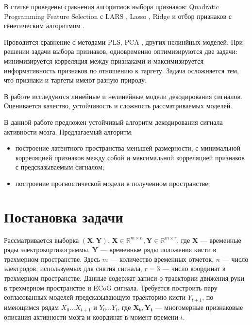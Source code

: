 \documentclass{article}
\begin{document}
В статье \cite{qpfs} проведены сравнения алгоритмов выбора признаков: Quadratic Programming Feature Selection  \cite{qpfs} с LARS \cite{MICHE20112413}, Lasso \cite{zhao2007stagewise}, Ridge \cite{ridge} и отбор признаков с генетическим алгоритмом \cite{tan2008genetic}. \par
Проводится сравнение с методами PLS, PCA\cite{abdi2003pls} \cite{wegelin2000survey}, других нелинйных моделей.  При решении задачи выбора признаков, одновременно оптимизируются две задачи: минимизируется корреляция между признаками и максимизируется информативность признаков по отношению к таргету. Задача осложняется тем, что признаки и таргеты имеют разную природу. \par
В работе исследуются линейные и нелинейные модели декодирования сигналов. Оценивается качество, устойчивость и сложность рассматриваемых моделей. \par
В данной работе предложен устойчивый алгоритм декодирования сигнала активности мозга. Предлагаемый алгоритм:
\begin{itemize}
    \item построение латентного пространства меньшей размерности, с минимальной корреляцией признаков между собой и максимальной корреляцией признаков с предсказываемым сигналом;
    \item построение прогностической модели в полученном пространстве;
\end{itemize}

\section{Постановка задачи}

Рассматривается выборка $(\mathbf{X}, \mathbf{Y}).$ $ \mathbf{X} \in \mathbb{R}^{m \times n},\mathbf{Y} \in \mathbb{R}^{m \times r}$, где $\mathbf{X}$ --- временные ряды электрокортикограммы, $\mathbf{Y}$ --- временные ряды положения кисти в трехмерном пространстве. Здесь $m$ --- количество временных отметок, $n$ ---  число электродов, используемых для снятия сигнала, $r = 3$ --- число координат в трехмерном пространстве. Данные содержат записи о траектории движения руки в трехмерном пространстве и ECoG сигнала. Требуется построить пару согласованных моделей предсказывающую траекторию кисти $Y_{t+1}$, по имеющимся рядам $X_0 \dots X_{t+1}$ и $Y_0 \dots Y_t$, где $\mathbf{X_t}, \mathbf{Y_t}$ --- многомерные признаковые описания активности мозга и координат в момент времени $t$.
\end{document}

